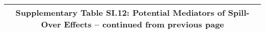 \begin{longtable}{llcccccccccc}
\multicolumn{12}{c}{{\bfseries Supplementary Table SI.12: Potential Mediators of Spill-Over Effects -- continued from previous page}} \\ \hline                                                                                                                                                                                                                                                                                                                                                                                                                                                                                                                                                                                                                                                                                                                                           

\end{longtable}
